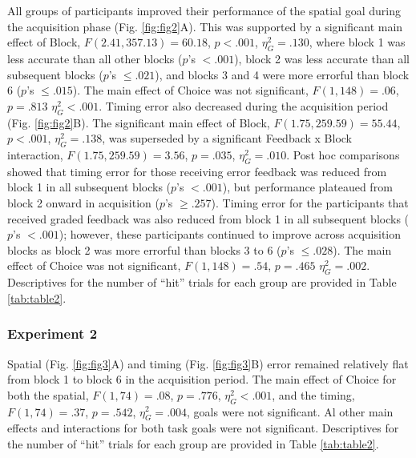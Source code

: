 \documentclass[
  doc, donotrepeattitle,floatsintext]{apa7}
\begin{document}
All groups of participants improved their performance of the spatial goal during the acquisition phase (Fig. \ref{fig:fig2}A). This was supported by a significant main effect of Block, \(F(2.41,357.13) = 60.18\), \(p < .001\), \(\eta_{G}^2 = .130\), where block 1 was less accurate than all other blocks (\(p\)'s \(< .001\)), block 2 was less accurate than all subsequent blocks (\(p\)'s \(\leq .021\)), and blocks 3 and 4 were more errorful than block 6 (\(p\)'s \(\leq .015\)). The main effect of Choice was not significant, \(F(1,148) = .06\), \(p = .813\) \(\eta_{G}^2 < .001\). Timing error also decreased during the acquisition period (Fig. \ref{fig:fig2}B). The significant main effect of Block, \(F(1.75,259.59) = 55.44\), \(p < .001\), \(\eta_{G}^2 = .138\), was superseded by a significant Feedback x Block interaction, \(F(1.75, 259.59) = 3.56\), \(p = .035\), \(\eta_{G}^2 = .010\). Post hoc comparisons showed that timing error for those receiving error feedback was reduced from block 1 in all subsequent blocks (\(p\)'s \(< .001\)), but performance plateaued from block 2 onward in acquisition (\(p\)'s \(\geq .257\)). Timing error for the participants that received graded feedback was also reduced from block 1 in all subsequent blocks (\(p\)'s \(< .001\)); however, these participants continued to improve across acquisition blocks as block 2 was more errorful than blocks 3 to 6 (\(p\)'s \(\leq .028\)). The main effect of Choice was not significant, \(F(1,148) = .54\), \(p = .465\) \(\eta_{G}^2 = .002\). Descriptives for the number of ``hit'' trials for each group are provided in Table \ref{tab:table2}.

\hypertarget{experiment-2-3}{%
\subsubsection{Experiment 2}\label{experiment-2-3}}

Spatial (Fig. \ref{fig:fig3}A) and timing (Fig. \ref{fig:fig3}B) error remained relatively flat from block 1 to block 6 in the acquisition period. The main effect of Choice for both the spatial, \(F(1,74) = .08\), \(p = .776\), \(\eta_{G}^2 < .001\), and the timing, \(F(1,74) = .37\), \(p = .542\), \(\eta_{G}^2 = .004\), goals were not significant. Al other main effects and interactions for both task goals were not significant. Descriptives for the number of ``hit'' trials for each group are provided in Table \ref{tab:table2}.
\end{document}
